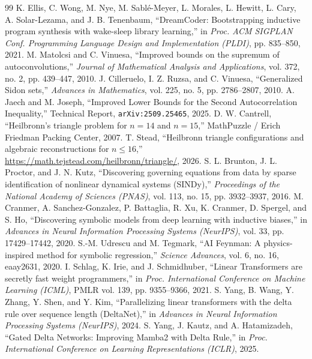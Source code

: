 \documentclass[11pt,a4paper]{article}
\begin{document}
\begin{thebibliography}{99}
 K. Ellis, C. Wong, M. Nye, M. Sabl\'{e}-Meyer, L. Morales, L. Hewitt, L. Cary, A. Solar-Lezama, and J. B. Tenenbaum, ``DreamCoder: Bootstrapping inductive program synthesis with wake-sleep library learning,'' in \emph{Proc. ACM SIGPLAN Conf. Programming Language Design and Implementation (PLDI)}, pp. 835--850, 2021.
 M. Matolcsi and C. Vinuesa, ``Improved bounds on the supremum of autoconvolutions,'' \emph{Journal of Mathematical Analysis and Applications}, vol. 372, no. 2, pp. 439--447, 2010.
 J. Cilleruelo, I. Z. Ruzsa, and C. Vinuesa, ``Generalized Sidon sets,'' \emph{Advances in Mathematics}, vol. 225, no. 5, pp. 2786--2807, 2010.
 A. Jaech and M. Joseph, ``Improved Lower Bounds for the Second Autocorrelation Inequality,'' Technical Report, \texttt{arXiv:2509.25465}, 2025.
 D. W. Cantrell, ``Heilbronn's triangle problem for $n = 14$ and $n = 15$,'' MathPuzzle / Erich Friedman Packing Center, 2007.
 T. Stead, ``Heilbronn triangle configurations and algebraic reconstructions for $n \le 16$,'' \url{https://math.tejstead.com/heilbronn/triangle/}, 2026.
 S. L. Brunton, J. L. Proctor, and J. N. Kutz, ``Discovering governing equations from data by sparse identification of nonlinear dynamical systems (SINDy),'' \emph{Proceedings of the National Academy of Sciences (PNAS)}, vol. 113, no. 15, pp. 3932--3937, 2016.
 M. Cranmer, A. Sanchez-Gonzalez, P. Battaglia, R. Xu, K. Cranmer, D. Spergel, and S. Ho, ``Discovering symbolic models from deep learning with inductive biases,'' in \emph{Advances in Neural Information Processing Systems (NeurIPS)}, vol. 33, pp. 17429--17442, 2020.
 S.-M. Udrescu and M. Tegmark, ``AI Feynman: A physics-inspired method for symbolic regression,'' \emph{Science Advances}, vol. 6, no. 16, eaay2631, 2020.
 I. Schlag, K. Irie, and J. Schmidhuber, ``Linear Transformers are secretly fast weight programmers,'' in \emph{Proc. International Conference on Machine Learning (ICML)}, PMLR vol. 139, pp. 9355--9366, 2021.
 S. Yang, B. Wang, Y. Zhang, Y. Shen, and Y. Kim, ``Parallelizing linear transformers with the delta rule over sequence length (DeltaNet),'' in \emph{Advances in Neural Information Processing Systems (NeurIPS)}, 2024.
 S. Yang, J. Kautz, and A. Hatamizadeh, ``Gated Delta Networks: Improving Mamba2 with Delta Rule,'' in \emph{Proc. International Conference on Learning Representations (ICLR)}, 2025.

\end{thebibliography}
\end{document}
